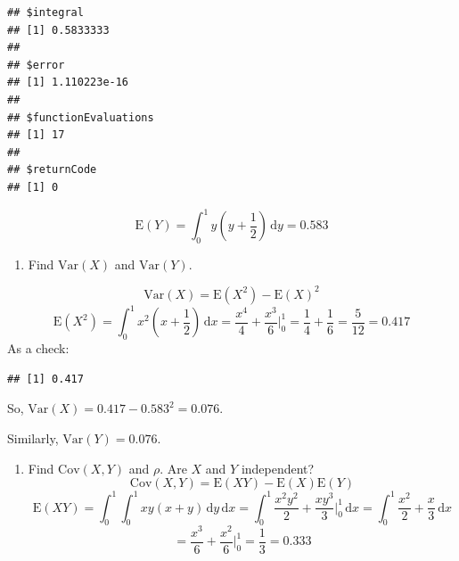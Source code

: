 \documentclass[
]{book}
\newenvironment{Shaded}{\begin{snugshade}}{\end{snugshade}}
\newcommand{\CommentTok}[1]{\textcolor[rgb]{0.56,0.35,0.01}{\textit{#1}}}
\newcommand{\ControlFlowTok}[1]{\textcolor[rgb]{0.13,0.29,0.53}{\textbf{#1}}}
\newcommand{\DataTypeTok}[1]{\textcolor[rgb]{0.13,0.29,0.53}{#1}}
\newcommand{\DecValTok}[1]{\textcolor[rgb]{0.00,0.00,0.81}{#1}}
\newcommand{\KeywordTok}[1]{\textcolor[rgb]{0.13,0.29,0.53}{\textbf{#1}}}
\newcommand{\NormalTok}[1]{#1}
\newcommand{\OperatorTok}[1]{\textcolor[rgb]{0.81,0.36,0.00}{\textbf{#1}}}
\newcommand{\StringTok}[1]{\textcolor[rgb]{0.31,0.60,0.02}{#1}}
\providecommand{\tightlist}{%
  \setlength{\itemsep}{0pt}\setlength{\parskip}{0pt}}
\begin{document}
\begin{verbatim}
## $integral
## [1] 0.5833333
## 
## $error
## [1] 1.110223e-16
## 
## $functionEvaluations
## [1] 17
## 
## $returnCode
## [1] 0
\end{verbatim}

\[
\mbox{E}(Y)=\int_0^1 y\left(y+\frac{1}{2}\right)\,\mathrm{d}y = 0.583
\]

\begin{enumerate}
\def\labelenumi{\alph{enumi}.}
\setcounter{enumi}{1}
\tightlist
\item
  Find \(\mbox{Var}(X)\) and \(\mbox{Var}(Y)\).
\end{enumerate}

\[
\mbox{Var}(X)=\mbox{E}(X^2)-\mbox{E}(X)^2
\]
\[
\mbox{E}(X^2)=\int_0^1 x^2\left(x+\frac{1}{2}\right)\,\mathrm{d}x = \frac{x^4}{4}+\frac{x^3}{6}\bigg|_0^1=\frac{1}{ 4}+\frac{1}{6}=\frac{5}{12}=0.417
\]
As a check:

\begin{Shaded}
\end{Shaded}

\begin{verbatim}
## [1] 0.417
\end{verbatim}

So, \(\mbox{Var}(X)=0.417-0.583^2=0.076\).

Similarly, \(\mbox{Var}(Y)=0.076\).

\begin{enumerate}
\def\labelenumi{\alph{enumi}.}
\setcounter{enumi}{2}
\tightlist
\item
  Find \(\mbox{Cov}(X,Y)\) and \(\rho\). Are \(X\) and \(Y\) independent?
  \[
  \mbox{Cov}(X,Y)=\mbox{E}(XY)-\mbox{E}(X)\mbox{E}(Y)
  \]
  \[
  \mbox{E}(XY)=\int_0^1\int_0^1 xy(x+y)\,\mathrm{d}y \,\mathrm{d}x = \int_0^1 \frac{x^2y^2}{2}+\frac{xy^3}{3}\bigg|_0^1 \,\mathrm{d}x = \int_0^1 \frac{x^2}{2}+\frac{x}{3}\,\mathrm{d}x
  \]
  \[
  =\frac{x^3}{6}+\frac{x^2}{6}\bigg|_0^1=\frac{1}{ 3}=0.333
  \]
\end{enumerate}
\end{document}
